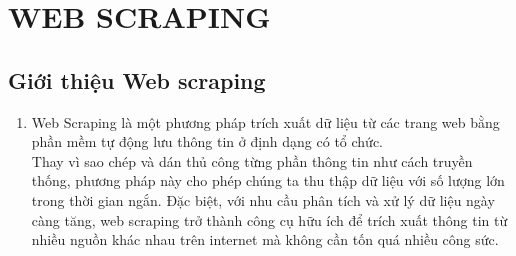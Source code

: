 \section{WEB SCRAPING}
\subsection{Giới thiệu Web scraping}
\begin{enumerate}
    \item []
    \hspace*{0.7cm} Web Scraping \cite{noauthor_web_2024} là một phương pháp trích xuất dữ liệu từ các trang web bằng phần mềm tự động lưu thông tin ở định dạng có tổ chức.\\
    
    \hspace*{0.7cm}Thay vì sao chép và dán thủ công từng phần thông tin như cách truyền thống, phương pháp này cho phép chúng ta thu thập dữ liệu với số lượng lớn trong thời gian ngắn. Đặc biệt, với nhu cầu phân tích và xử lý dữ liệu ngày càng tăng, web scraping trở thành công cụ hữu ích để trích xuất thông tin từ nhiều nguồn khác nhau trên internet mà không cần tốn quá nhiều công sức.
\end{enumerate}

